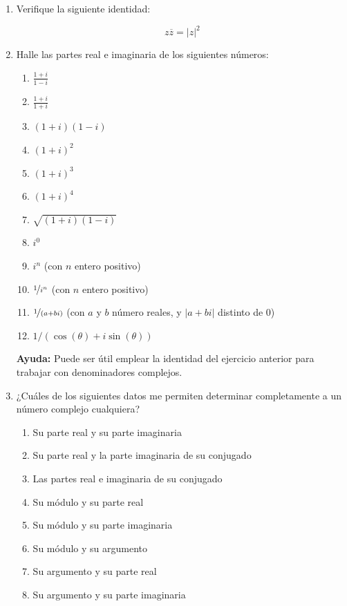 \documentclass[11pt,spanish]{article}
\begin{document}
\begin{enumerate}
    \item Verifique la siguiente identidad:
    
        $$z\overline{z} = |z|^2$$


    \item Halle las partes real e imaginaria de los siguientes números:
    
    \begin{enumerate}
        \item $\frac{1+i}{1-i}$
        \item $\frac{1+i}{1+i}$
        \item $(1+i)(1-i)$
        \item $(1+i)^2$
        \item $(1+i)^3$
        \item $(1+i)^4$
        \item $\sqrt{(1+i)(1-i)}$
        \item $i^0$
        \item $i^n$ (con $n$ entero positivo)
        \item $\nicefrac{1}{i^n}$ (con $n$ entero positivo)
        \item $\nicefrac{1}{(a + bi)}$ (con $a$ y $b$ número reales, y $|a + bi|$ distinto de $0$)	
        \item $1 / (\cos(\theta) + i \sin(\theta))$
    \end{enumerate}
    
    \textbf{Ayuda:} Puede ser útil emplear la identidad del ejercicio anterior para trabajar con denominadores complejos.


    \item ¿Cuáles de los siguientes datos me permiten determinar completamente a un número complejo cualquiera?
    
    \begin{enumerate}
        \item Su parte real y su parte imaginaria
        \item Su parte real y la parte imaginaria de su conjugado
        \item Las partes real e imaginaria de su conjugado
        \item Su módulo y su parte real
        \item Su módulo y su parte imaginaria
        \item Su módulo y su argumento
        \item Su argumento y su parte real
        \item Su argumento y su parte imaginaria
    \end{enumerate}


\end{enumerate}
\end{document}
